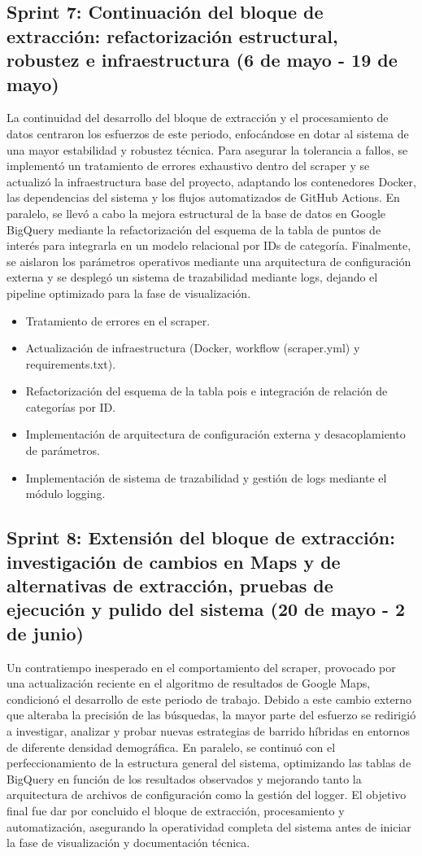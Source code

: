 \subsection{Sprint 7: Continuación del bloque de extracción: refactorización estructural, robustez e infraestructura (6 de mayo - 19 de mayo)}
La continuidad del desarrollo del bloque de extracción y el procesamiento de datos centraron los esfuerzos de este periodo, enfocándose en dotar al sistema de una mayor estabilidad y robustez técnica. Para asegurar la tolerancia a fallos, se implementó un tratamiento de errores exhaustivo dentro del scraper y se actualizó la infraestructura base del proyecto, adaptando los contenedores Docker, las dependencias del sistema y los flujos automatizados de GitHub Actions. En paralelo, se llevó a cabo la mejora estructural de la base de datos en Google BigQuery mediante la refactorización del esquema de la tabla de puntos de interés para integrarla en un modelo relacional por IDs de categoría. Finalmente, se aislaron los parámetros operativos mediante una arquitectura de configuración externa y se desplegó un sistema de trazabilidad mediante logs, dejando el pipeline optimizado para la fase de visualización.

\begin{itemize}
    \item Tratamiento de errores en el scraper.
    \item Actualización de infraestructura (Docker, workflow (scraper.yml) y requirements.txt).
    \item Refactorización del esquema de la tabla pois e integración de relación de categorías por ID.
    \item Implementación de arquitectura de configuración externa y desacoplamiento de parámetros.
    \item Implementación de sistema de trazabilidad y gestión de logs mediante el módulo logging.
\end{itemize}

\subsection{Sprint 8: Extensión del bloque de extracción: investigación de cambios en Maps y de alternativas de extracción, pruebas de ejecución y pulido del sistema (20 de mayo - 2 de junio)}
Un contratiempo inesperado en el comportamiento del scraper, provocado por una actualización reciente en el algoritmo de resultados de Google Maps, condicionó el desarrollo de este periodo de trabajo. Debido a este cambio externo que alteraba la precisión de las búsquedas, la mayor parte del esfuerzo se redirigió a investigar, analizar y probar nuevas estrategias de barrido híbridas en entornos de diferente densidad demográfica. En paralelo, se continuó con el perfeccionamiento de la estructura general del sistema, optimizando las tablas de BigQuery en función de los resultados observados y mejorando tanto la arquitectura de archivos de configuración como la gestión del logger. El objetivo final fue dar por concluido el bloque de extracción, procesamiento y automatización, asegurando la operatividad completa del sistema antes de iniciar la fase de visualización y documentación técnica.

